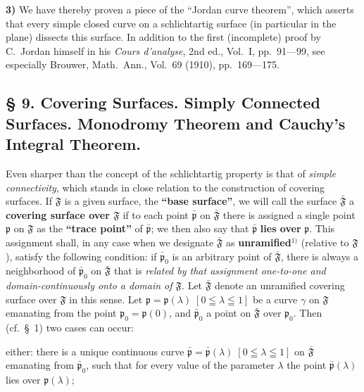 \documentclass{article}
\begin{document}
\textbf{3)} We have thereby proven a piece of the ``Jordan curve theorem'', which asserts that every simple closed curve on a schlichtartig surface (in particular in the plane) dissects this surface. In addition to the first (incomplete) proof by C.~Jordan himself in his \emph{Cours d'analyse}, 2nd ed., Vol.~I, pp.~91---99, see especially Brouwer, Math.~Ann., Vol.~69 (1910), pp.~169---175.


\subsection*{§ 9. Covering Surfaces. Simply Connected Surfaces. Monodromy Theorem and Cauchy's Integral Theorem.}

Even sharper than the concept of the schlichtartig property is that of \emph{simple connectivity}, which stands in close relation to the construction of covering surfaces. If $\mathfrak{F}$ is a given surface, the \textbf{``base surface''}, we will call the surface $\bar{\mathfrak{F}}$ a \textbf{covering surface over $\mathfrak{F}$} if to each point $\bar{\mathfrak{p}}$ on $\bar{\mathfrak{F}}$ there is assigned a single point $\mathfrak{p}$ on $\mathfrak{F}$ as the \textbf{``trace point''} of $\bar{\mathfrak{p}}$; we then also say that $\bar{\mathfrak{p}}$ \textbf{lies over} $\mathfrak{p}$. This assignment shall, in any case when we designate $\bar{\mathfrak{F}}$ as \textbf{unramified}${}^{1)}$ (relative to $\mathfrak{F}$), satisfy the following condition: if $\bar{\mathfrak{p}}_0$ is an arbitrary point of $\bar{\mathfrak{F}}$, there is always a neighborhood of $\bar{\mathfrak{p}}_0$ on $\bar{\mathfrak{F}}$ that is \emph{related by that assignment one-to-one and domain-continuously onto a domain of $\mathfrak{F}$}. Let $\bar{\mathfrak{F}}$ denote an unramified covering surface over $\mathfrak{F}$ in this sense. Let $\mathfrak{p} = \mathfrak{p}(\lambda)\;[0 \leqq \lambda \leqq 1]$ be a curve $\gamma$ on $\mathfrak{F}$ emanating from the point $\mathfrak{p}_0 = \mathfrak{p}(0)$, and $\bar{\mathfrak{p}}_0$ a point on $\bar{\mathfrak{F}}$ over $\mathfrak{p}_0$. Then (cf.\ §~1) two cases can occur:

either: there is a unique continuous curve $\bar{\mathfrak{p}} = \bar{\mathfrak{p}}(\lambda)\;[0 \leqq \lambda \leqq 1]$ on $\bar{\mathfrak{F}}$ emanating from $\bar{\mathfrak{p}}_0$, such that for every value of the parameter $\lambda$ the point $\bar{\mathfrak{p}}(\lambda)$ lies over $\mathfrak{p}(\lambda)$;
\end{document}

